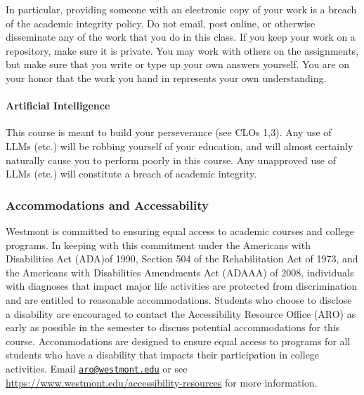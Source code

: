 \documentclass[
  twoside]{article}
\begin{document}
In particular, providing someone with an electronic copy of your work is
a breach of the academic integrity policy. Do not email, post online, or
otherwise disseminate any of the work that you do in this class. If you
keep your work on a repository, make sure it is private. You may work
with others on the assignments, but make sure that you write or type up
your own answers yourself. You are on your honor that the work you hand
in represents your own understanding.

\paragraph{Artificial Intelligence}\label{artificial-intelligence}

This course is meant to build your perseverance (see CLOs 1,3). Any use
of LLMs (etc.) will be robbing yourself of your education, and will
almost certainly naturally cause you to perform poorly in this course.
Any unapproved use of LLMs (etc.) will constitute a breach of academic
integrity.

\subsubsection{Accommodations and
Accessability}\label{accommodations-and-accessability}

Westmont is committed to ensuring equal access to academic courses and
college programs. In keeping with this commitment under the Americans
with Disabilities Act (ADA)of 1990, Section 504 of the Rehabilitation
Act of 1973, and the Americans with Disabilities Amendments Act (ADAAA)
of 2008, individuals with diagnoses that impact major life activities
are protected from discrimination and are entitled to reasonable
accommodations. Students who choose to disclose a disability are
encouraged to contact the Accessibility Resource Office (ARO) as early
as possible in the semester to discuss potential accommodations for this
course. Accommodations are designed to ensure equal access to programs
for all students who have a disability that impacts their participation
in college activities. Email
\href{mailto:aro@westmont.edu}{\nolinkurl{aro@westmont.edu}} or see
\url{https://www.westmont.edu/accessibility-resources} for more
information.
\end{document}
